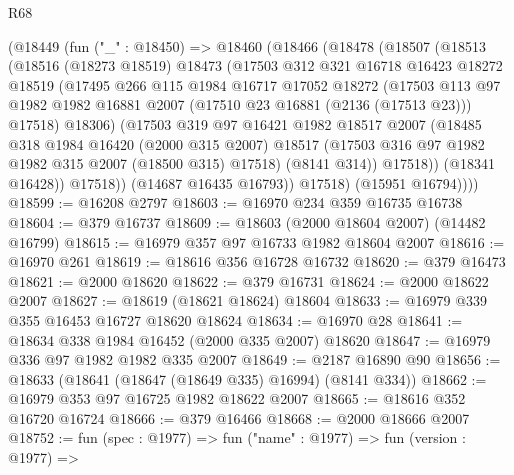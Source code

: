 \begin{lexlean}{R68}
\begin{coremodule}
      (@18449
        (fun ("_" : @18450) =>
        @18460
          (@18466
            (@18478
              (@18507
                (@18513
                  (@18516
                    (@18273 @18519)
                    @18473
                    (@17503
                      @312
                      @321
                      @16718
                      @16423
                      @18272
                      @18519
                      (@17495
                        @266
                        @115
                        @1984
                        @16717
                        @17052
                        @18272
                        (@17503
                          @113
                          @97
                          @1982
                          @1982
                          @16881
                          @2007
                          (@17510 @23 @16881 (@2136 (@17513 @23)))
                          @17518)
                        @18306)
                      (@17503
                        @319
                        @97
                        @16421
                        @1982
                        @18517
                        @2007
                        (@18485
                          @318
                          @1984
                          @16420
                          (@2000 @315 @2007)
                          @18517
                          (@17503 @316 @97 @1982 @1982 @315 @2007 (@18500 @315) @17518)
                          (@8141 @314))
                        @17518))
                    (@18341 @16428))
                  @17518))
              (@14687 @16435 @16793))
            @17518)
          (@15951 @16794))))
@18599 := @16208 @2797
@18603 := @16970 @234 @359 @16735 @16738
@18604 := @379 @16737
@18609 := @18603 (@2000 @18604 @2007) (@14482 @16799)
@18615 := @16979 @357 @97 @16733 @1982 @18604 @2007
@18616 := @16970 @261
@18619 := @18616 @356 @16728 @16732
@18620 := @379 @16473
@18621 := @2000 @18620
@18622 := @379 @16731
@18624 := @2000 @18622 @2007
@18627 := @18619 (@18621 @18624) @18604
@18633 := @16979 @339 @355 @16453 @16727 @18620 @18624
@18634 := @16970 @28
@18641 := @18634 @338 @1984 @16452 (@2000 @335 @2007) @18620
@18647 := @16979 @336 @97 @1982 @1982 @335 @2007
@18649 := @2187 @16890 @90
@18656 := @18633 (@18641 (@18647 (@18649 @335) @16994) (@8141 @334))
@18662 := @16979 @353 @97 @16725 @1982 @18622 @2007
@18665 := @18616 @352 @16720 @16724
@18666 := @379 @16466
@18668 := @2000 @18666 @2007
@18752 := fun (spec : @1977) =>
  fun ("name" : @1977) =>
  fun (version : @1977) =>

\end{coremodule}
\end{lexlean}
